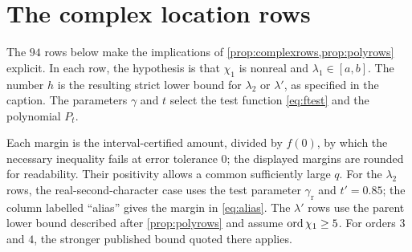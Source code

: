 \appendix
\section{The complex location rows}\label{app:rows}

The $94$ rows below make the implications of \cref{prop:complexrows,prop:polyrows}
explicit. In each row, the hypothesis is that $\chi_1$ is nonreal and
$\lambda_1\in[a,b]$. The number $h$ is the resulting strict lower bound for
$\lambda_2$ or $\lambda'$, as specified in the caption. The parameters $\gamma$ and
$t$ select the test function \eqref{eq:ftest} and the polynomial $P_t$.

Each margin is the interval-certified amount, divided by $f(0)$, by which the necessary
inequality fails at error tolerance $0$; the displayed margins are rounded for
readability. Their positivity allows a common sufficiently large $q$.
For the $\lambda_2$ rows, the real-second-character case uses the test parameter $\gamma_{\mathrm r}$ and $t'=0.85$;
the column labelled ``alias'' gives the margin in \eqref{eq:alias}.
The $\lambda'$ rows use the parent lower bound described after \cref{prop:polyrows}
and assume $\operatorname{ord}\chi_1\ge5$. For orders $3$ and $4$, the stronger published bound
quoted there applies.

